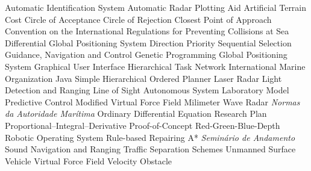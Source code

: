 \begin{acronym}
      {Automatic Identification System}
     {Automatic Radar Plotting Aid}
      {Artificial Terrain Cost}
      {Circle of Acceptance}
      {Circle of Rejection}
      {Closest Point of Approach}
  {Convention on the International Regulations for Preventing Collisions at Sea}
     {Differential Global Positioning System}
     {Direction Priority Sequential Selection}
      {Guidance, Navigation and Control}
       {Genetic Programming}
      {Global Positioning System}
      {Graphical User Interface}
      {Hierarchical Task Network}
      {International Marine Organization}
    {Java Simple Hierarchical Ordered Planner}
    {Laser Radar}
    {Light Detection and Ranging}
      {Line of Sight}
      {Autonomous System Laboratory}
      {Model Predictive Control}
     {Modified Virtual Force Field}
      {Milimeter Wave Radar}
   {\textit{Normas da Autoridade Marítima}}
      {Ordinary Differential Equation}
      {Research Plan}
      {Proportional–Integral–Derivative}
      {Proof-of-Concept}
     {Red-Green-Blue-Depth}
      {Robotic Operating System}
    {Rule-based Repairing A*}
       {\textit{Seminário de Andamento}}
    {Sound Navigation and Ranging}
      {Traffic Separation Schemes}
      {Unmanned Surface Vehicle}
      {Virtual Force Field}
       {Velocity Obstacle}
\end{acronym}